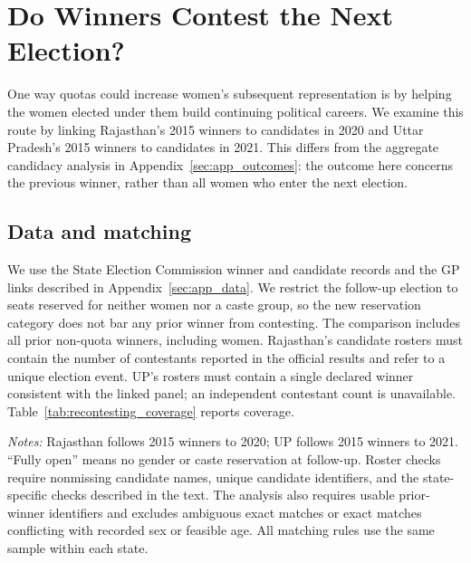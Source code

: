\clearpage
\section{Do Winners Contest the Next Election?}\label{sec:recontesting}
\suppressfloats[t]

One way quotas could increase women's subsequent representation is by helping the women elected under them build continuing political careers. We examine this route by linking Rajasthan's 2015 winners to candidates in 2020 and Uttar Pradesh's 2015 winners to candidates in 2021. This differs from the aggregate candidacy analysis in Appendix~\ref{sec:app_outcomes}: the outcome here concerns the previous winner, rather than all women who enter the next election.

\subsection{Data and matching}

We use the State Election Commission winner and candidate records and the GP links described in Appendix~\ref{sec:app_data}. We restrict the follow-up election to seats reserved for neither women nor a caste group, so the new reservation category does not bar any prior winner from contesting. The comparison includes all prior non-quota winners, including women. Rajasthan's candidate rosters must contain the number of contestants reported in the official results and refer to a unique election event. UP's rosters must contain a single declared winner consistent with the linked panel; an independent contestant count is unavailable. Table~\ref{tab:recontesting_coverage} reports coverage.

\begin{table}[!htbp]
\centering
\caption{Coverage of the Winner-to-Candidate Comparison}
\label{tab:recontesting_coverage}
\small

\begin{minipage}{\textwidth}\footnotesize
\emph{Notes:} Rajasthan follows 2015 winners to 2020; UP follows 2015 winners to 2021. ``Fully open'' means no gender or caste reservation at follow-up. Roster checks require nonmissing candidate names, unique candidate identifiers, and the state-specific checks described in the text. The analysis also requires usable prior-winner identifiers and excludes ambiguous exact matches or exact matches conflicting with recorded sex or feasible age. All matching rules use the same sample within each state.
\end{minipage}
\end{table}

